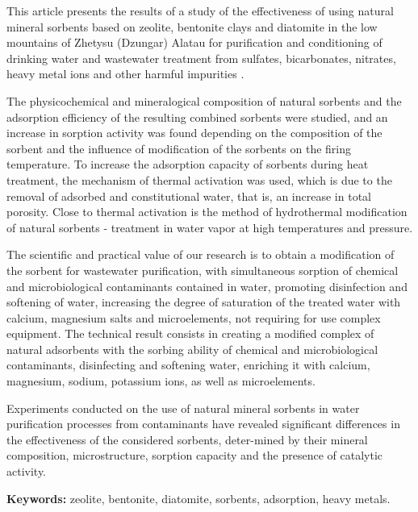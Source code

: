This article presents the results of a study of the effectiveness of
using natural mineral sorbents based on zeolite, bentonite clays and
diatomite in the low mountains of Zhetysu (Dzungar) Alatau for
purification and conditioning of drinking water and wastewater treatment
from sulfates, bicarbonates, nitrates, heavy metal ions and other
harmful impurities .

The physicochemical and mineralogical composition of natural sorbents
and the adsorption efficiency of the resulting combined sorbents were
studied, and an increase in sorption activity was found depending on the
composition of the sorbent and the influence of modification of the
sorbents on the firing temperature. To increase the adsorption capacity
of sorbents during heat treatment, the mechanism of thermal activation
was used, which is due to the removal of adsorbed and constitutional
water, that is, an increase in total porosity. Close to thermal
activation is the method of hydrothermal modification of natural
sorbents - treatment in water vapor at high temperatures and pressure.

The scientific and practical value of our research is to obtain a
modification of the sorbent for wastewater purification, with
simultaneous sorption of chemical and microbiological contaminants
contained in water, promoting disinfection and softening of water,
increasing the degree of saturation of the treated water with calcium,
magnesium salts and microelements, not requiring for use complex
equipment. The technical result consists in creating a modified complex
of natural adsorbents with the sorbing ability of chemical and
microbiological contaminants, disinfecting and softening water,
enriching it with calcium, magnesium, sodium, potassium ions, as well as
microelements.

Experiments conducted on the use of natural mineral sorbents in water
purification processes from contaminants have revealed significant
differences in the effectiveness of the considered sorbents, deter-mined
by their mineral composition, microstructure, sorption capacity and the
presence of catalytic activity.

{\bfseries Keywords:} zeolite, bentonite, diatomite, sorbents, adsorption,
heavy metals.

